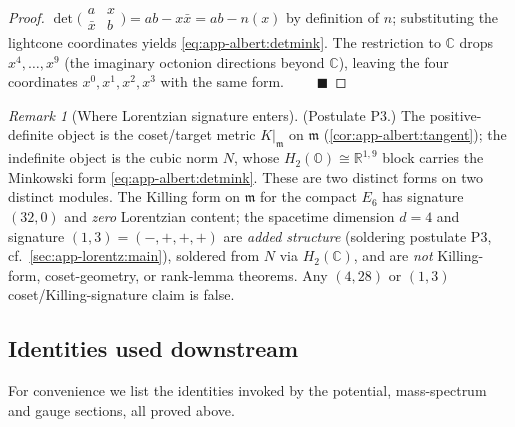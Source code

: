\documentclass[11pt]{article}
\theoremstyle{plain}
\theoremstyle{definition}
\theoremstyle{remark}
\newtheorem{remark}[theorem]{Remark}
\begin{document}
\begin{proof}
$\det\!\bigl(\begin{smallmatrix}a&x\\\bar x&b\end{smallmatrix}\bigr)
=ab-x\bar x=ab-n(x)$ by definition of $n$; substituting the lightcone
coordinates yields \eqref{eq:app-albert:detmink}. The restriction to
$\mathbb C$ drops $x^4,\dots,x^9$ (the imaginary octonion directions beyond
$\mathbb C$), leaving the four coordinates $x^0,x^1,x^2,x^3$ with the same form.
$\qquad\blacksquare$
\end{proof}

\begin{remark}[Where Lorentzian signature enters]\label{rmk:app-albert:signature}
\textup{(Postulate P3.)}
The positive-definite object is the coset/target metric $K|_{\mathfrak m}$ on
$\mathfrak m$ (\autoref{cor:app-albert:tangent}); the indefinite object is the
cubic norm $N$, whose $H_2(\mathbb O)\cong\mathbb R^{1,9}$ block carries the
Minkowski form \eqref{eq:app-albert:detmink}. These are two distinct forms on two
distinct modules. The Killing form on $\mathfrak m$ for the compact $E_6$ has
signature $(32,0)$ and \emph{zero} Lorentzian content; the spacetime dimension
$d=4$ and signature $(1,3)=(-,+,+,+)$ are \emph{added structure} (soldering
postulate P3, cf.\ \autoref{sec:app-lorentz:main}), soldered from $N$ via
$H_2(\mathbb C)$, and are \emph{not} Killing-form, coset-geometry, or rank-lemma
theorems. Any $(4,28)$ or $(1,3)$ coset/Killing-signature claim is false.
\end{remark}

\subsection{Identities used downstream}
\label{sec:app-albert:identities}

For convenience we list the identities invoked by the potential, mass-spectrum and
gauge sections, all proved above.
\end{document}
